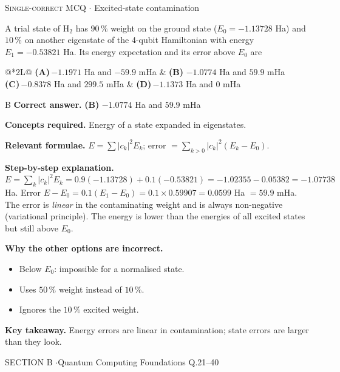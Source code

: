 \documentclass[11pt,a4paper]{article}
\newcommand{\optlabel}[1]{\textbf{(#1)}}
\newcommand{\correctlabel}[1]{\textcolor{okgreen}{\textbf{(#1)}\,\ding{51}}}
\newenvironment{qitem}[1]{\begin{list}{}{\setlength{\leftmargin}{3.3em}\setlength{\labelwidth}{3.1em}%
  \setlength{\labelsep}{0.2em}\setlength{\topsep}{3pt}\setlength{\parsep}{3pt}}\item[\textbf{Q.#1}\hfill]}{\end{list}}
\newcommand{\qsep}{\par\vspace{2pt}{\color{black!15}\hrule}\vspace{4pt}}
\newcommand{\qmeta}[2]{{\footnotesize\color{black!60}\textsc{#1} \;$\cdot$\; #2}\par}
\begin{document}
\begin{qitem}{20}
\qmeta{Single-correct MCQ}{Excited-state contamination}
A trial state of H$_2$ has $90\,\%$ weight on the ground state ($E_0 = -1.13728$ Ha) and $10\,\%$ on another eigenstate of the 4-qubit Hamiltonian with energy
$E_1 = -0.53821$ Ha. Its energy expectation and its error above $E_0$ are
\par\smallskip\noindent\begin{tabularx}{\linewidth}{@{}*{2}{L}@{}}
\optlabel{A}\,$-1.1971$ Ha and $-59.9$ mHa & \correctlabel{B}\,$-1.0774$ Ha and $59.9$ mHa \\[3pt]
\optlabel{C}\,$-0.8378$ Ha and $299.5$ mHa & \optlabel{D}\,$-1.1373$ Ha and $0$ mHa
\end{tabularx}
\end{qitem}
\begin{solbox}{B}
\textbf{\color{brand}Correct answer.} \textcolor{okgreen}{\textbf{(B)}} $-1.0774$ Ha and $59.9$ mHa

\textbf{\color{brand}Concepts required.} Energy of a state expanded in eigenstates.

\textbf{\color{brand}Relevant formulae.} $E = \sum|c_k|^2E_k$; error $= \sum_{k>0}|c_k|^2(E_k - E_0)$.

\textbf{\color{brand}Step-by-step explanation.} $E = \sum_k|c_k|^2E_k = 0.9(-1.13728) + 0.1(-0.53821) = -1.02355 - 0.05382 = -1.07738$ Ha.
Error $E - E_0 = 0.1(E_1 - E_0) = 0.1\times0.59907 = 0.0599$ Ha $= 59.9$ mHa. The error is \emph{linear} in the contaminating weight and is
always non-negative (variational principle). The energy is lower than the energies of all excited states but still above $E_0$.

\textbf{\color{brand}Why the other options are incorrect.}
\begin{itemize}[leftmargin=2.4em, itemsep=1pt, topsep=2pt]
\item[\textbf{(A)}] Below $E_0$: impossible for a normalised state.
\item[\textbf{(C)}] Uses $50\,\%$ weight instead of $10\,\%$.
\item[\textbf{(D)}] Ignores the $10\,\%$ excited weight.
\end{itemize}
\textbf{\color{brand}Key takeaway.} Energy errors are linear in contamination; state errors are larger than they look.
\end{solbox}
\qsep

\newpage

\begin{sectionbanner}SECTION B \enspace$\cdot$\enspace Quantum Computing Foundations \hfill Q.21--40\end{sectionbanner}
\end{document}
